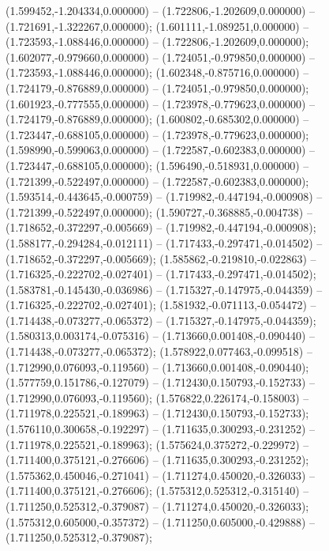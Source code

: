  (1.599452,-1.204334,0.000000) -- (1.722806,-1.202609,0.000000) -- (1.721691,-1.322267,0.000000);
 (1.601111,-1.089251,0.000000) -- (1.723593,-1.088446,0.000000) -- (1.722806,-1.202609,0.000000);
 (1.602077,-0.979660,0.000000) -- (1.724051,-0.979850,0.000000) -- (1.723593,-1.088446,0.000000);
 (1.602348,-0.875716,0.000000) -- (1.724179,-0.876889,0.000000) -- (1.724051,-0.979850,0.000000);
 (1.601923,-0.777555,0.000000) -- (1.723978,-0.779623,0.000000) -- (1.724179,-0.876889,0.000000);
 (1.600802,-0.685302,0.000000) -- (1.723447,-0.688105,0.000000) -- (1.723978,-0.779623,0.000000);
 (1.598990,-0.599063,0.000000) -- (1.722587,-0.602383,0.000000) -- (1.723447,-0.688105,0.000000);
 (1.596490,-0.518931,0.000000) -- (1.721399,-0.522497,0.000000) -- (1.722587,-0.602383,0.000000);
 (1.593514,-0.443645,-0.000759) -- (1.719982,-0.447194,-0.000908) -- (1.721399,-0.522497,0.000000);
 (1.590727,-0.368885,-0.004738) -- (1.718652,-0.372297,-0.005669) -- (1.719982,-0.447194,-0.000908);
 (1.588177,-0.294284,-0.012111) -- (1.717433,-0.297471,-0.014502) -- (1.718652,-0.372297,-0.005669);
 (1.585862,-0.219810,-0.022863) -- (1.716325,-0.222702,-0.027401) -- (1.717433,-0.297471,-0.014502);
 (1.583781,-0.145430,-0.036986) -- (1.715327,-0.147975,-0.044359) -- (1.716325,-0.222702,-0.027401);
 (1.581932,-0.071113,-0.054472) -- (1.714438,-0.073277,-0.065372) -- (1.715327,-0.147975,-0.044359);
 (1.580313,0.003174,-0.075316) -- (1.713660,0.001408,-0.090440) -- (1.714438,-0.073277,-0.065372);
 (1.578922,0.077463,-0.099518) -- (1.712990,0.076093,-0.119560) -- (1.713660,0.001408,-0.090440);
 (1.577759,0.151786,-0.127079) -- (1.712430,0.150793,-0.152733) -- (1.712990,0.076093,-0.119560);
 (1.576822,0.226174,-0.158003) -- (1.711978,0.225521,-0.189963) -- (1.712430,0.150793,-0.152733);
 (1.576110,0.300658,-0.192297) -- (1.711635,0.300293,-0.231252) -- (1.711978,0.225521,-0.189963);
 (1.575624,0.375272,-0.229972) -- (1.711400,0.375121,-0.276606) -- (1.711635,0.300293,-0.231252);
 (1.575362,0.450046,-0.271041) -- (1.711274,0.450020,-0.326033) -- (1.711400,0.375121,-0.276606);
 (1.575312,0.525312,-0.315140) -- (1.711250,0.525312,-0.379087) -- (1.711274,0.450020,-0.326033);
 (1.575312,0.605000,-0.357372) -- (1.711250,0.605000,-0.429888) -- (1.711250,0.525312,-0.379087);
